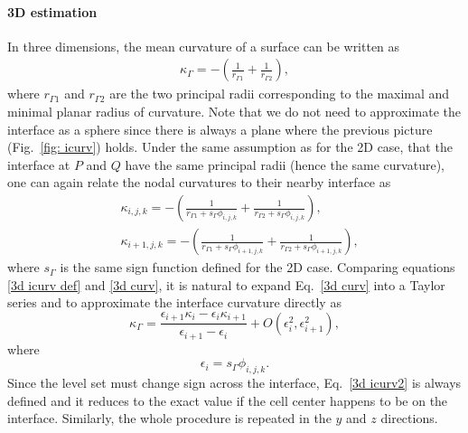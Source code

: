 \paragraph{3D estimation}

In three dimensions, the mean curvature of a surface can be written as
\begin{equation}
  \begin{aligned}
    \kappa_\Gamma = -(\frac{1}{r_{\Gamma1}}+\frac{1}{r_{\Gamma2}}),
  \end{aligned}
  \label{3d icurv def}
\end{equation}
where $r_{\Gamma1}$ and $r_{\Gamma2}$ are the two principal radii corresponding to the maximal and minimal planar radius of curvature. Note that we do not need to approximate the interface as a sphere since there is always a plane where the previous picture (Fig.\ \ref{fig: icurv}) holds. Under the same assumption as for the 2D case, that the interface at $P$ and $Q$ have the same principal radii (hence the same curvature), one can again relate the nodal curvatures to their nearby interface as
\begin{equation}
  \begin{aligned}
    & \kappa_{i,j,k} = -(\frac{1}{r_{\Gamma1}+s_\Gamma\phi_{i,j,k}}+\frac{1}{r_{\Gamma2}+s_\Gamma\phi_{i,j,k}}), \\
    &\kappa_{i+1,j,k} = -(\frac{1}{r_{\Gamma1}+s_\Gamma\phi_{i+1,j,k}}+\frac{1}{r_{\Gamma2}+s_\Gamma\phi_{i+1,j,k}}),
  \end{aligned}
  \label{3d curv}
\end{equation}
where $s_\Gamma$ is the same sign function defined for the 2D case. %
Comparing equations \eqref{3d icurv def} and \eqref{3d curv}, it is natural to expand Eq.\ \eqref{3d curv} into a Taylor series and to approximate the interface curvature directly as 
\begin{equation}
    \kappa_\Gamma = \frac{\epsilon_{i+1}\kappa_i - \epsilon_i\kappa_{i+1}}{\epsilon_{i+1} - \epsilon_i} +O(\epsilon_i^2,\epsilon_{i+1}^2),
  \label{3d icurv2}
\end{equation}
\noindent where
\begin{equation}
    \epsilon_i = s_\Gamma\phi_{i,j,k}.
  \label{none}
\end{equation}
Since the level set must change sign across the interface, Eq.\ \eqref{3d icurv2} is always defined and it reduces to the exact value if the cell center happens to be on the interface. Similarly, the whole procedure is repeated in the $y$ and $z$ directions.


